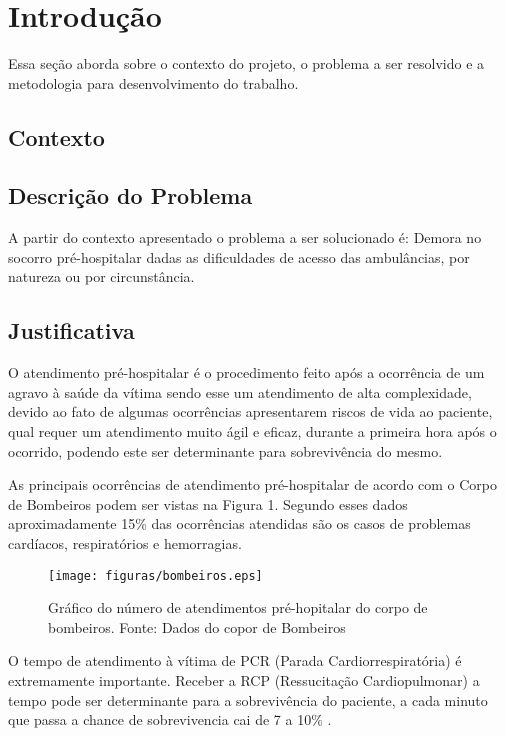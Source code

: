 \chapter[Introdução]{Introdução}\label{cap1}
	Essa seção aborda sobre o contexto do projeto, o problema a ser resolvido e a metodologia para desenvolvimento do trabalho. 
\section{Contexto}
  

\section{Descrição do Problema}

A partir do contexto apresentado o problema a ser solucionado é:
Demora no socorro pré-hospitalar dadas as dificuldades de acesso das ambulâncias, por natureza ou por circunstância.
  
\section{Justificativa}

O atendimento pré-hospitalar é o procedimento feito após a ocorrência de um agravo à saúde da vítima \cite{SBC} sendo esse um atendimento de alta complexidade, 
devido ao fato de algumas ocorrências apresentarem riscos de vida ao paciente, qual requer um atendimento muito ágil e eficaz, durante a primeira hora após o ocorrido, 
podendo este ser determinante para sobrevivência do mesmo.\cite{PQA} 

As principais ocorrências de atendimento pré-hospitalar de acordo com o Corpo de Bombeiros podem ser vistas na Figura 1. Segundo esses dados aproximadamente 15\% das ocorrências atendidas são os casos de problemas cardíacos, respiratórios e hemorragias.

 \begin{figure}[ht]
	\centering
		\texttt{[image: figuras/bombeiros.eps]}
	\caption{Gráfico do número de atendimentos pré-hopitalar do corpo de bombeiros. Fonte: Dados do copor de Bombeiros}
\end{figure}

O tempo de atendimento à vítima de PCR (Parada Cardiorrespiratória) é extremamente importante. Receber a RCP (Ressucitação Cardiopulmonar) a tempo pode ser determinante para a sobrevivência do paciente, a cada minuto que passa a chance de sobrevivencia cai de 7 a 10\% \cite{SBC}. 

